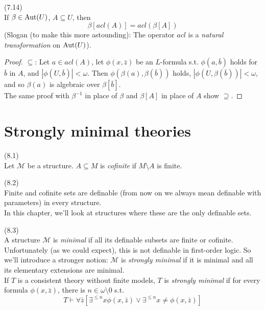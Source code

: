 \documentclass[a4paper]{article}
\begin{document}
\begin{prop} (7.14)\\
    If $\beta \in \operatorname{Aut}(U)$, $A \subseteq U$, then 
    $$\beta[acl(A)] = acl(\beta[A])$$
    (Slogan (to make this more astounding): The operator $acl$ is a \emph{natural transformation} on $\operatorname{Aut}(U)$).
    \begin{proof}
        $\subseteq$: Let $a \in acl(A)$, let $\phi(x,\bar{z})$ be an $L$-formula s.t. $\phi(a,\bar{b})$ holds for $\bar{b}$ in $A$, and $|\phi(U,\bar{b})| < \omega$. Then $\phi(\beta(a),\beta(\bar{b}))$ holds, $|\phi(U,\beta(\bar{b}))| < \omega$, and so $\beta(a)$ is algebraic over $\beta[\bar{b}]$.\\
        The same proof with $\beta^{-1}$ in place of $\beta$ and $\beta[A]$ in place of $A$ show $\supseteq$.
    \end{proof}
\end{prop}

\newpage

\section{Strongly minimal theories}

\begin{defi} (8.1)\\
    Let $\mathcal{M}$ be a structure. $A\subseteq M$ is \emph{cofinite} if $M \setminus A$ is finite.
\end{defi}

\begin{rem} (8.2)\\
    Finite and cofinite sets are definable (from now on we always mean definable with parameters) in every structure.\\
    In this chapter, we'll look at structures where these are the only definable sets.
\end{rem}

\begin{defi} (8.3)\\
    A structure $\mathcal{M}$ is \emph{minimal} if all its definable subsets are finite or cofinite.\\
    Unfortunately (as we could expect), this is not definable in first-order logic. So we'll introduce a stronger notion: $\mathcal{M}$ is \emph{strongly minimal} if it is minimal and all its elementary extensions are minimal.\\
    If $T$ is a consistent theory without finite models, $T$ is \emph{strongly minimal} if for every formula $\phi(x,\bar{z})$, there is $n \in \omega \setminus 0$ s.t.
    $$T \vdash \forall \bar{z} [\exists^{\leq n} x \phi(x,\bar{z}) \vee \exists^{\leq n} x \neq \phi(x,\bar{z})]$$
\end{defi}
\end{document}
